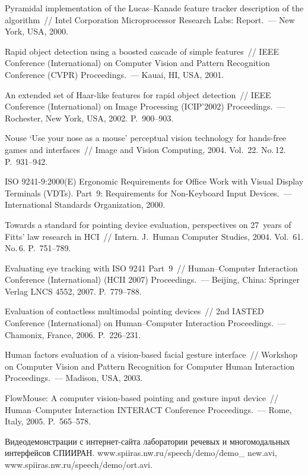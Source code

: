 \begin{multicols}{2}
{{\begin{thebibliography}{99}
Pyramidal implementation of the Lucas--Kanade feature tracker description of the 
algorithm~// Intel Corporation Microprocessor Research Labs: Report.~--- New 
York, USA, 2000.

Rapid object detection using a boosted cascade of simple features~// IEEE Conference
(International) on Computer Vision and Pattern Recognition Conference 
(CVPR) Proceedings.~--- Kauai, HI, USA, 2001.

An extended set of Haar-like features for rapid object detection~// IEEE 
 Conference (International) on Image Processing (ICIP'2002) Proceedings.~--- Rochester, New York, 
USA, 2002. P.~900--903.

Nouse `Use your nose as a mouse' perceptual vision technology for hands-free games 
and interfaces~// Image and Vision Computing, 2004. Vol.~22. No.\,12. P.~931--942.

ISO 9241-9:2000(E) Ergonomic Requirements for Office Work with Visual Display 
Terminals (VDTs). Part~9: Requirements for Non-Keyboard Input Devices.~--- 
International Standards Organization, 2000.

Towards a standard for pointing device evaluation, perspectives on 27~years of Fitts' 
law research in HCI~// Intern. J.~Human Computer Studies, 2004. Vol.~61. No.\,6. 
P.~751--789.

Evaluating eye tracking with ISO 9241 Part~9~// Human--Computer Interaction 
 Conference (International) (HCII 2007) Proceedings.~--- Beijing, China: Springer Verlag LNCS 
4552, 2007. P.~779--788.

Evaluation of contactless multimodal pointing devices~//  2nd IASTED Conference (International) 
on Human--Computer Interaction Proceedings.~--- Chamonix, France, 
2006. P.~226--231.

Human factors evaluation of a vision-based facial gesture interface~// Workshop on 
Computer Vision and Pattern Recognition for Computer Human Interaction 
Proceedings.~--- Madison, USA, 2003.

FlowMouse: A computer vision-based pointing and gesture input device~// 
Human--Computer Interaction INTERACT Conference Proceedings.~--- Rome, Italy, 
2005. P.~565--578.

\label{end\stat}

Видеодемонстрации с интернет-сайта лаборатории речевых и многомодальных 
интерфейсов \mbox{СПИИРАН}. {\sf www.spiiras.nw.ru/speech/demo/demo\_ new.avi}, {\sf 
www.spiiras.nw.ru/speech/demo/ort.avi}.
 \end{thebibliography}
}
}


\end{multicols}